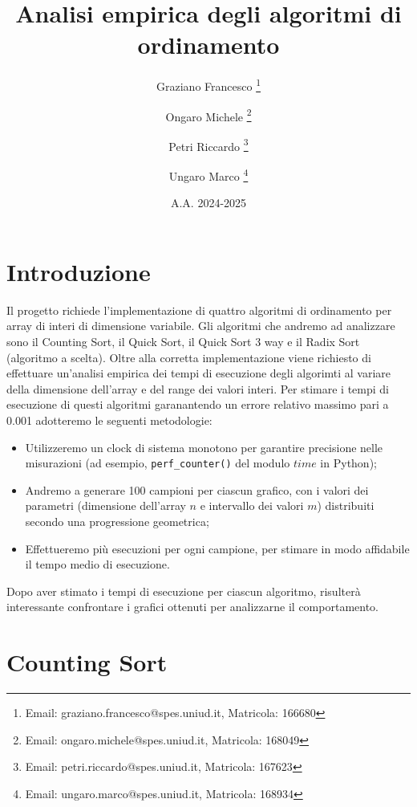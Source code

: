 \documentclass[a4paper, 12pt, oneside]{book}
\title{Analisi empirica degli algoritmi di ordinamento}
\author[ ]{Graziano Francesco \thanks{Email: graziano.francesco@spes.uniud.it, Matricola: 166680}}
\author[ ]{Ongaro Michele \thanks{Email: ongaro.michele@spes.uniud.it, Matricola: 168049}}
\author[ ]{Petri Riccardo \thanks{Email: petri.riccardo@spes.uniud.it, Matricola: 167623}}
\author[ ]{Ungaro Marco \thanks{Email: ungaro.marco@spes.uniud.it, Matricola: 168934}}
\affil[ ]{Università degli Studi di Udine, Dipartimento di Matematica e Informatica}
\date{A.A. 2024-2025}
\begin{document}
\renewcommand{\contentsname}{Contenuti}
\renewcommand{\chaptername}{Capitolo}

\maketitle %
\tableofcontents %

\chapter{Introduzione}\label{chap:Introduzione} %

Il progetto richiede l'implementazione di quattro algoritmi di ordinamento per array di interi di dimensione variabile.
Gli algoritmi che andremo ad analizzare sono il Counting Sort, il Quick Sort, il Quick Sort 3 way e il Radix Sort (algoritmo a scelta).
Oltre alla corretta implementazione viene richiesto di effettuare un'analisi empirica dei tempi di esecuzione degli algorimti al variare della dimensione dell'array e del range dei valori interi. Per stimare i tempi di esecuzione di questi algoritmi garanantendo un errore relativo massimo pari a 0.001 adotteremo le seguenti metodologie:

\begin{itemize}
    \item Utilizzeremo un clock di sistema monotono per garantire precisione nelle misurazioni (ad esempio, \texttt{perf\_counter()} del modulo \(time\) in Python);
    \item Andremo a generare 100 campioni per ciascun grafico, con i valori dei parametri (dimensione dell'array \(n\) e intervallo dei valori \(m\)) distribuiti secondo una progressione geometrica;
    \item Effettueremo più esecuzioni per ogni campione, per stimare in modo affidabile il tempo medio di esecuzione.
\end{itemize}

\noindent Dopo aver stimato i tempi di esecuzione per ciascun algoritmo, risulterà interessante confrontare i grafici ottenuti per analizzarne il comportamento. 



 
\chapter{Counting Sort}\label{chap:Counting Sort} %
\end{document}

